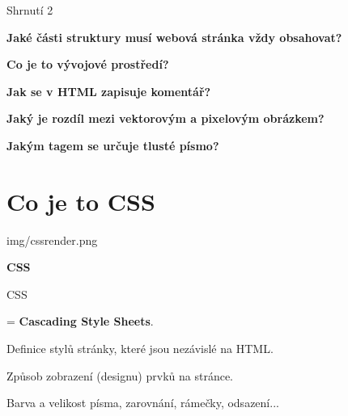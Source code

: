 \documentclass[aspectratio=1610]{beamer}
\begin{document}
\begin{frame}{Shrnutí 2}
    \begin{cardTiny}
        \begin{center}
            \textbf{Jaké části struktury musí webová stránka vždy obsahovat?}
        \end{center}
    \end{cardTiny}
    \begin{cardTiny}
        \begin{center}
            \textbf{Co je to vývojové prostředí?}
        \end{center}
    \end{cardTiny}
    \begin{cardTiny}
        \begin{center}
            \textbf{Jak se v HTML zapisuje komentář?}
        \end{center}
    \end{cardTiny}
    \begin{cardTiny}
        \begin{center}
            \textbf{Jaký je rozdíl mezi vektorovým a pixelovým obrázkem?}
        \end{center}
    \end{cardTiny}
    \begin{cardTiny}
        \begin{center}
            \textbf{Jakým tagem se určuje tlusté písmo?}
        \end{center}
    \end{cardTiny}
\end{frame}


\section{Co je to CSS}

\begin{frameImg}[width]{img/cssrender.png}
    \vspace*{60mm}
    \begin{cardTiny}
        \vspace*{\fill}
        \begin{center}
            \textbf{CSS}
        \end{center}
    \end{cardTiny}
\end{frameImg}

\begin{frame}{CSS}
    \begin{cardTiny}
        \begin{flushleft}
            = \textbf{Cascading Style Sheets}.

            Definice stylů stránky, které jsou nezávislé na HTML.

            Způsob zobrazení (designu) prvků na stránce.

            \vspace{2ex}
            Barva a velikost písma, zarovnání, rámečky, odsazení...
        \end{flushleft}
    \end{cardTiny}
\end{frame}
\end{document}
